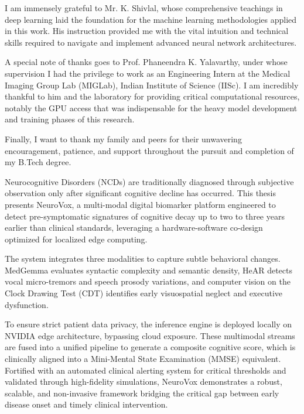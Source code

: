 \documentclass[BTech]{iitmdiss}
\begin{document}
I am immensely grateful to Mr. K. Shivlal, whose comprehensive teachings in deep learning laid the foundation for the machine learning methodologies applied in this work. His instruction provided me with the vital intuition and technical skills required to navigate and implement advanced neural network architectures.

A special note of thanks goes to Prof. Phaneendra K. Yalavarthy, under whose supervision I had the privilege to work as an Engineering Intern at the Medical Imaging Group Lab (MIGLab), Indian Institute of Science (IISc). I am incredibly thankful to him and the laboratory for providing critical computational resources, notably the GPU access that was indispensable for the heavy model development and training phases of this research.

Finally, I want to thank my family and peers for their unwavering encouragement, patience, and support throughout the pursuit and completion of my B.Tech degree.

\abstract

Neurocognitive Disorders (NCDs) are traditionally diagnosed through subjective observation only after significant cognitive decline has occurred. This thesis presents NeuroVox, a multi-modal digital biomarker platform engineered to detect pre-symptomatic signatures of cognitive decay up to two to three years earlier than clinical standards, leveraging a hardware-software co-design optimized for localized edge computing. 

The system integrates three modalities to capture subtle behavioral changes. MedGemma evaluates syntactic complexity and semantic density, HeAR detects vocal micro-tremors and speech prosody variations, and computer vision on the Clock Drawing Test (CDT) identifies early visuospatial neglect and executive dysfunction. 

To ensure strict patient data privacy, the inference engine is deployed locally on NVIDIA edge architecture, bypassing cloud exposure. These multimodal streams are fused into a unified pipeline to generate a composite cognitive score, which is clinically aligned into a Mini-Mental State Examination (MMSE) equivalent. Fortified with an automated clinical alerting system for critical thresholds and validated through high-fidelity simulations, NeuroVox demonstrates a robust, scalable, and non-invasive framework bridging the critical gap between early disease onset and timely clinical intervention.
\end{document}
